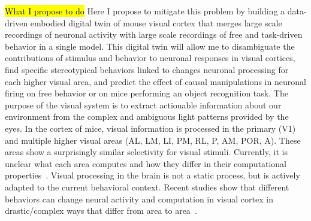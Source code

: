 

\hl{What I propose to do} Here I propose to mitigate this problem by building a data-driven embodied digital twin of mouse visual cortex that merges large scale recordings of neuronal activity with large scale recordings of free and task-driven behavior in a single model. 
This digital twin will allow me to  disambiguate the contributions of stimulus and behavior to neuronal responses in visual cortices,  find specific stereotypical behaviors linked to changes neuronal processing for each higher visual area, and  predict the effect of causal manipulations in neuronal firing on free behavior or on mice performing an object recognition task. 
The purpose of the visual system is to extract actionable information about our environment from the complex and ambiguous light patterns provided by the eyes. 
In the cortex of mice, visual information is processed in the primary (V1) and multiple higher visual areas (AL, LM, LI, PM, RL, P, AM, POR, A). 
These areas show a surprisingly similar selectivity for visual stimuli.
Currently, it is unclear what each area computes and how they differ in their computational properties~\parencite{Conwell2021-pw}. 
Visual processing in the brain is not a static process, but is actively adapted to the current behavioral context.
Recent studies show that different behaviors can change neural activity and computation in visual cortex in drastic/complex ways that differ from area to area~\parencite{Musall2019-kd,Stringer2019-lt,Franke2022-do}.
